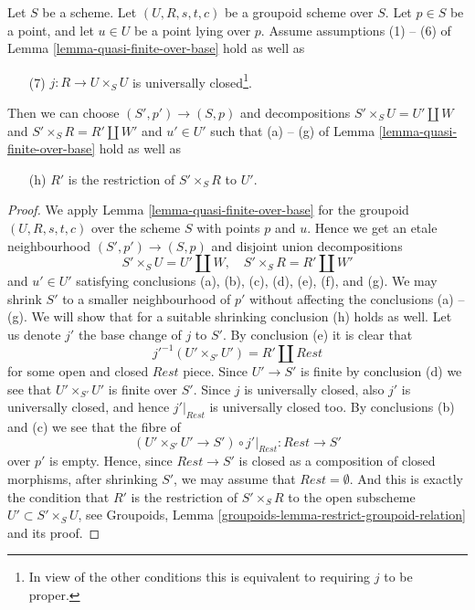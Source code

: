 \begin{lemma}
\label{lemma-quasi-finite-over-base-j-proper}
Let $S$ be a scheme.
Let $(U, R, s, t, c)$ be a groupoid scheme over $S$.
Let $p \in S$ be a point, and let $u \in U$ be a point lying over $p$.
Assume assumptions (1) -- (6) of
Lemma \ref{lemma-quasi-finite-over-base}
hold as well as
\begin{enumerate}
\item[(7)] $j : R \to U \times_S U$ is universally closed\footnote{In view of
the other conditions this is equivalent to requiring $j$ to be proper.}.
\end{enumerate}
Then we can choose $(S', p') \to (S, p)$ and decompositions
$S' \times_S U = U' \amalg W$ and $S' \times_S R = R' \amalg W'$
and $u' \in U'$ such that (a) -- (g) of
Lemma \ref{lemma-quasi-finite-over-base}
hold as well as
\begin{enumerate}
\item[(h)] $R'$ is the restriction of $S' \times_S R$ to $U'$.
\end{enumerate}
\end{lemma}

\begin{proof}
We apply Lemma \ref{lemma-quasi-finite-over-base} for the
groupoid $(U, R, s, t, c)$ over the scheme $S$ with points $p$ and $u$.
Hence we get an etale neighbourhood
$(S', p') \to (S, p)$ and disjoint union decompositions
$$
S' \times_S U = U' \amalg W, \quad
S' \times_S R = R' \amalg W'
$$
and $u' \in U'$ satisfying conclusions (a), (b), (c), (d), (e), (f), and (g).
We may shrink $S'$ to a smaller neighbourhood of $p'$ without
affecting the conclusions (a) -- (g). We will show that for a suitable
shrinking conclusion (h) holds as well.
Let us denote $j'$ the base change of $j$ to $S'$.
By conclusion (e) it is clear that
$$
j'^{-1}(U' \times_{S'} U') = R' \amalg Rest
$$
for some open and closed $Rest$ piece. Since $U' \to S'$ is finite
by conclusion (d) we see that $U' \times_{S'} U'$ is finite over $S'$.
Since $j$ is universally closed, also $j'$ is universally closed, and
hence $j'|_{Rest}$ is universally closed too. By conclusions
(b) and (c) we see that the fibre of
$$
(U' \times_{S'} U' \to S') \circ j'|_{Rest} :
Rest
\longrightarrow
S'
$$
over $p'$ is empty. Hence, since $Rest \to S'$ is closed as a composition
of closed morphisms, after shrinking $S'$, we may assume that
$Rest = \emptyset$. And this is exactly the condition that $R'$ is
the restriction of $S' \times_S R$ to the open subscheme
$U' \subset S' \times_S U$, see
Groupoids, Lemma \ref{groupoids-lemma-restrict-groupoid-relation}
and its proof.
\end{proof}

